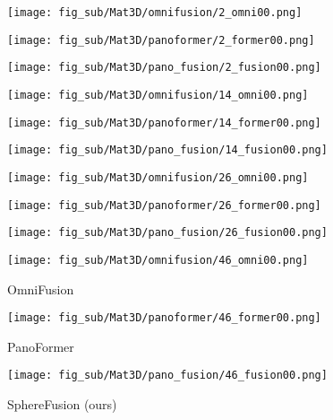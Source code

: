 \begin{figure*}[t]
	\centering
	\captionsetup[subfigure]{labelformat=empty}
	
	
	\begin{subfigure}{0.3\linewidth}
		\texttt{[image: fig\_sub/Mat3D/omnifusion/2\_omni00.png]}
	\end{subfigure}
	\begin{subfigure}{0.3\linewidth}
		\texttt{[image: fig\_sub/Mat3D/panoformer/2\_former00.png]}
	\end{subfigure}
	\begin{subfigure}{0.3\linewidth}
		\texttt{[image: fig\_sub/Mat3D/pano\_fusion/2\_fusion00.png]}
	\end{subfigure}
	
	\vspace{1pt}
		
	
	\begin{subfigure}{0.3\linewidth}
		\texttt{[image: fig\_sub/Mat3D/omnifusion/14\_omni00.png]}
	\end{subfigure}
	\begin{subfigure}{0.3\linewidth}
		\texttt{[image: fig\_sub/Mat3D/panoformer/14\_former00.png]}
	\end{subfigure}
	\begin{subfigure}{0.3\linewidth}
		\texttt{[image: fig\_sub/Mat3D/pano\_fusion/14\_fusion00.png]}
	\end{subfigure}

	\vspace{1pt}
	
	\begin{subfigure}{0.3\linewidth}
		\texttt{[image: fig\_sub/Mat3D/omnifusion/26\_omni00.png]}
	\end{subfigure}
	\begin{subfigure}{0.3\linewidth}
		\texttt{[image: fig\_sub/Mat3D/panoformer/26\_former00.png]}
	\end{subfigure}
	\begin{subfigure}{0.3\linewidth}
		\texttt{[image: fig\_sub/Mat3D/pano\_fusion/26\_fusion00.png]}
	\end{subfigure}
	
	
	\vspace{1pt}
	
	\begin{subfigure}{0.3\linewidth}
		\texttt{[image: fig\_sub/Mat3D/omnifusion/46\_omni00.png]}
		\caption{OmniFusion \cite{li2022omnifusion}}
	\end{subfigure}
	\begin{subfigure}{0.3\linewidth}
		\texttt{[image: fig\_sub/Mat3D/panoformer/46\_former00.png]}
		\caption{PanoFormer \cite{shen2022panoformer}}
	\end{subfigure}
	\begin{subfigure}{0.3\linewidth}
		\texttt{[image: fig\_sub/Mat3D/pano\_fusion/46\_fusion00.png]}
		\caption{SphereFusion (ours)}
	\end{subfigure}	
	

\end{figure*}
